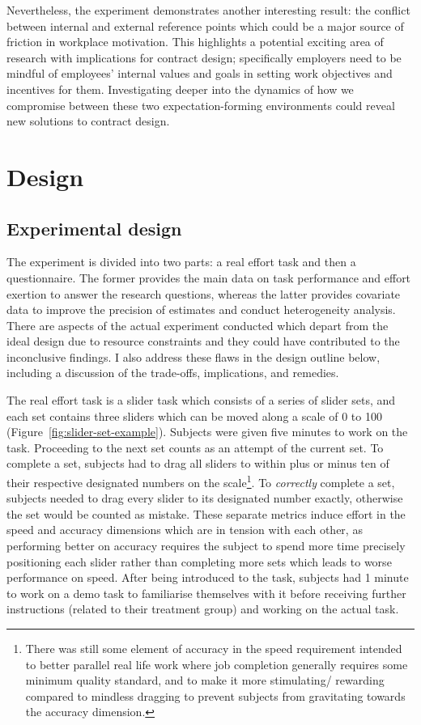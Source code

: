 \documentclass[12pt, letterpaper]{article}
\begin{document}
Nevertheless, the experiment demonstrates another interesting result: the conflict between internal and external reference points which could be a major source of friction in workplace motivation. This highlights a potential exciting area of research with implications for contract design; specifically employers need to be mindful of employees' internal values and goals in setting work objectives and incentives for them. Investigating deeper into the dynamics of how we compromise between these two expectation-forming environments could reveal new solutions to contract design.

\section{Design}

\subsection{Experimental design}

The experiment is divided into two parts: a real effort task and then a questionnaire. The former provides the main data on task performance and effort exertion to answer the research questions, whereas the latter provides covariate data to improve the precision of estimates and conduct heterogeneity analysis. There are aspects of the actual experiment conducted which depart from the ideal design due to resource constraints and they could have contributed to the inconclusive findings. I also address these flaws in the design outline below, including a discussion of the trade-offs, implications, and remedies.

The real effort task is a slider task which consists of a series of slider sets, and each set contains three sliders which can be moved along a scale of 0 to 100 (Figure~\ref{fig:slider-set-example}). Subjects were given five minutes to work on the task. Proceeding to the next set counts as an attempt of the current set. To complete a set, subjects had to drag all sliders to within plus or minus ten of their respective designated numbers on the scale\footnote{There was still some element of accuracy in the speed requirement intended to better parallel real life work where job completion generally requires some minimum quality standard, and to make it more stimulating/ rewarding compared to mindless dragging to prevent subjects from gravitating towards the accuracy dimension.}. To \emph{correctly} complete a set, subjects needed to drag every slider to its designated number exactly, otherwise the set would be counted as mistake. These separate metrics induce effort in the speed and accuracy dimensions which are in tension with each other, as performing better on accuracy requires the subject to spend more time precisely positioning each slider rather than completing more sets which leads to worse performance on speed. After being introduced to the task, subjects had 1 minute to work on a demo task to familiarise themselves with it before receiving further instructions (related to their treatment group) and working on the actual task.
\end{document}
